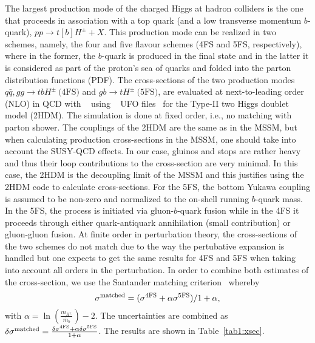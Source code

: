 The largest production mode of the charged Higgs at hadron colliders is the one that proceeds in association with a top quark (and a low transverse momentum $b$-quark), $pp \rightarrow t[b]H^{\pm}+X$. This production mode can be realized in two schemes, namely, the four and five flavour schemes (4FS and 5FS, respectively), where in the former, the $b$-quark is produced in the final state and  in the latter it is considered as part of the proton's sea of quarks and folded into the parton distribution functions (PDF). The cross-sections of the two production modes $q\bar{q}, gg \rightarrow tbH^{\pm} ~\text{(4FS)}$ and $gb \rightarrow tH^{\pm} ~\text{(5FS)}$, are evaluated at next-to-leading order (NLO) in QCD with ~\cite{Alwall:2014hca} using ~\cite{Alloul:2013bka} UFO files~\cite{Degrande:2011ua,Degrande:2014vpa} for the Type-II two Higgs doublet model (2HDM). The simulation is done at fixed order, i.e., no matching with parton shower. The couplings of the 2HDM are the same as in the MSSM, but when calculating production cross-sections in the MSSM, one should take into account the SUSY-QCD effects. In our case, gluinos and stops are rather heavy and thus their loop contributions to the cross-section are very minimal. In this case, the 2HDM is the decoupling limit of the MSSM and this justifies using the 2HDM code to calculate cross-sections. For the 5FS, the bottom Yukawa coupling is assumed to be non-zero and normalized to the on-shell running $b$-quark mass. In the 5FS, the process is initiated via gluon-$b$-quark fusion while in the 4FS it proceeds through either quark-antiquark annihilation (small contribution) or gluon-gluon fusion. At finite order in perturbation theory, the cross-sections of the two schemes do not match due to the way the pertubative expansion is handled but one expects to get the same results for 4FS and 5FS when taking into account all orders in the perturbation. In order to combine both estimates of the cross-section, we use the Santander matching criterion~\cite{Harlander:2011aa} whereby 
\begin{equation}
\sigma^{\rm matched}= ({\sigma^{4\rm FS}+\alpha\sigma^{5\rm FS}})/{1+\alpha},
\label{matched}
\end{equation}  
with $\alpha=\ln\left(\frac{m_{H^{\pm}}}{\bar{m}_b}\right)-2$. The uncertainties are combined as $\delta\sigma^{\rm matched}=\frac{\delta\sigma^{4\rm FS}+\alpha\delta\sigma^{5\rm FS}}{1+\alpha}$. The results are shown in Table~\ref{tab1:xsec}.


